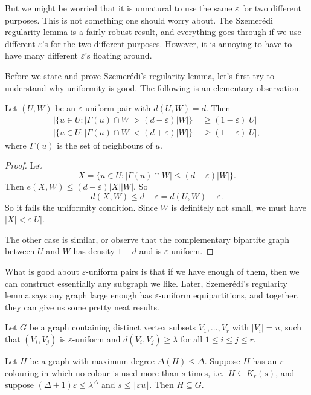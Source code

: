 \documentclass[a4paper]{article}
\begin{document}
But we might be worried that it is unnatural to use the same $\varepsilon$ for two different purposes. This is not something one should worry about. The Szemer\'edi regularity lemma is a fairly robust result, and everything goes through if we use different $\varepsilon$'s for the two different purposes. However, it is annoying to have to have many different $\varepsilon$'s floating around.

Before we state and prove Szemer\'edi's regularity lemma, let's first try to understand why uniformity is good. The following is an elementary observation.
\begin{lemma}
  Let $(U, W)$ be an $\varepsilon$-uniform pair with $d(U, W) = d$. Then
  \begin{align*}
    |\{u \in U: |\Gamma(u) \cap W| > (d - \varepsilon) |W|\}| &\geq (1 - \varepsilon)|U|\\
    |\{u \in U: |\Gamma(u) \cap W| < (d + \varepsilon) |W|\}| &\geq (1 - \varepsilon)|U|,
  \end{align*}
  where $\Gamma(u)$ is the set of neighbours of $u$.
\end{lemma}

\begin{proof}
  Let
  \[
    X = \{u \in U: |\Gamma(u) \cap W| \leq (d - \varepsilon)|W|\}.
  \]
  Then $e(X, W) \leq (d - \varepsilon) |X||W|$. So
  \[
    d(X, W) \leq d - \varepsilon = d(U, W) - \varepsilon.
  \]
  So it fails the uniformity condition. Since $W$ is definitely not small, we must have $|X| < \varepsilon |U|$.

  The other case is similar, or observe that the complementary bipartite graph between $U$ and $W$ has density $1 - d$ and is $\varepsilon$-uniform.
\end{proof}

What is good about $\varepsilon$-uniform pairs is that if we have enough of them, then we can construct essentially any subgraph we like. Later, Szemer\'edi's regularity lemma says any graph large enough has $\varepsilon$-uniform equipartitions, and together, they can give us some pretty neat results.
\begin{lemma}
  Let $G$ be a graph containing distinct vertex subsets $V_1, \ldots, V_r$ with $|V_i| = u$, such that $(V_i, V_j)$ is $\varepsilon$-uniform and $d(V_i, V_j) \geq \lambda$ for all $1 \leq i \leq j \leq r$.

  Let $H$ be a graph with maximum degree $\Delta(H) \leq \Delta$. Suppose $H$ has an $r$-colouring in which no colour is used more than $s$ times, i.e.\ $H \subseteq K_r(s)$, and suppose $(\Delta + 1) \varepsilon \leq \lambda^\Delta$ and $s \leq \lfloor \varepsilon u\rfloor$. Then $H \subseteq G$.
\end{lemma}
\end{document}
